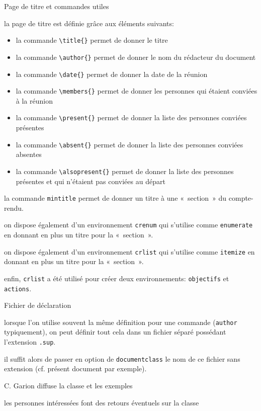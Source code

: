 \documentclass[french,cr]{supaero-mins}
\begin{document}
\begin{crlist}{Page de titre et commandes utiles}
\item la page de titre est définie grâce aux éléments suivants:

  \begin{itemize}
  \item la commande \verb!\title{}! permet de donner le titre
  \item la commande \verb!\author{}! permet de donner le nom du
    rédacteur du document
  \item la commande \verb!\date{}! permet de donner la date de la
    réunion
  \item la commande \verb!\members{}! permet de donner les personnes
    qui étaient conviées à la réunion
  \item la commande \verb!\present{}! permet de donner la liste des
    personnes conviées présentes
  \item la commande \verb!\absent{}! permet de donner la liste des
    personnes conviées absentes
  \item la commande \verb!\alsopresent{}! permet de donner la liste
    des personnes présentes et qui n'étaient pas conviées au départ
  \end{itemize}

\item la commande \verb!mintitle! permet de donner un titre à une
  «~section~» du compte-rendu.
\item on dispose également d'un environnement \verb!crenum! qui
  s'utilise comme \verb!enumerate! en donnant en plus un titre pour la
  «~section~».
\item on dispose également d'un environnement \verb!crlist! qui
  s'utilise comme \verb!itemize! en donnant en plus un titre pour la
  «~section~».
\item enfin, \verb!crlist! a été utilisé pour créer deux
  environnements: \verb!objectifs! et \verb!actions!.
\end{crlist}

\begin{crlist}{Fichier de déclaration}
\item lorsque l'on utilise souvent la même définition pour une
  commande (\verb!author! typiquement), on peut définir tout cela dans
  un fichier séparé possédant l'extension \verb!.sup!.
\item il suffit alors de passer en option de \verb!documentclass! le
  nom de ce fichier sans extension (cf. présent document par exemple).
\end{crlist}







\begin{actions}
\item C. Garion diffuse la classe et les exemples
\item les personnes intéressées font des retours éventuels sur la
  classe
\end{actions}
\end{document}
